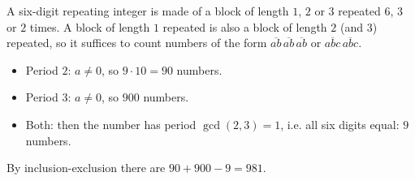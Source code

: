 A six-digit repeating integer is made of a block of length $1$, $2$ or $3$ repeated $6$, $3$ or $2$ times. A block of length $1$ repeated is also a block of length $2$ (and $3$) repeated, so it suffices to count numbers of the form $\overline{ab}\,\overline{ab}\,\overline{ab}$ or $\overline{abc}\,\overline{abc}$.
\begin{itemize}
\item Period $2$: $a\ne0$, so $9\cdot10=90$ numbers.
\item Period $3$: $a\ne0$, so $900$ numbers.
\item Both: then the number has period $\gcd(2,3)=1$, i.e. all six digits equal: $9$ numbers.
\end{itemize}
By inclusion-exclusion there are $90+900-9=\boxed{981}$.
